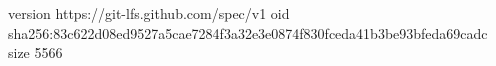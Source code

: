 version https://git-lfs.github.com/spec/v1
oid sha256:83c622d08ed9527a5cae7284f3a32e3e0874f830fceda41b3be93bfeda69cadc
size 5566
